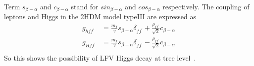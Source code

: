 Term $s_{\beta-\alpha}$ and $c_{\beta-\alpha}$ stand for $sin_{\beta-\alpha}$ and $cos_{\beta-\alpha}$ respectively. The coupling of leptons and Higgs in the 2HDM model typeIII are expressed as
\begin{equation}
\begin{aligned}
g_{hff^{'}}&=\frac{m_{f}}{v}s_{\beta-\alpha}\delta_{ff^{'}}+\frac{\rho_{ff^{'}}}{\sqrt{2}}c_{\beta-\alpha}\\
g_{Hff^{'}}&=\frac{m_{f}}{v}s_{\beta-\alpha}\delta_{ff^{'}}-\frac{\rho_{ff^{'}}}{\sqrt{2}}c_{\beta-\alpha}\\
\end{aligned}
\end{equation}
So this shows the possibility of LFV Higgs decay at tree level~\cite{PhysRevD.90.115004}.








